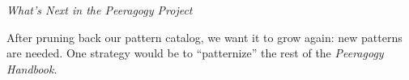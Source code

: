 \smallskip

\begin{framed}
\noindent 
\emph{What's Next in the Peeragogy Project}
\begin{collectinmacro}{\ScrapbookWN}{}{}
After pruning back our pattern catalog, we want it to grow again: new patterns are needed.
One strategy would be to ``patternize'' the rest of the \emph{Peeragogy Handbook.}
\end{collectinmacro}
\ScrapbookWN
\end{framed}


